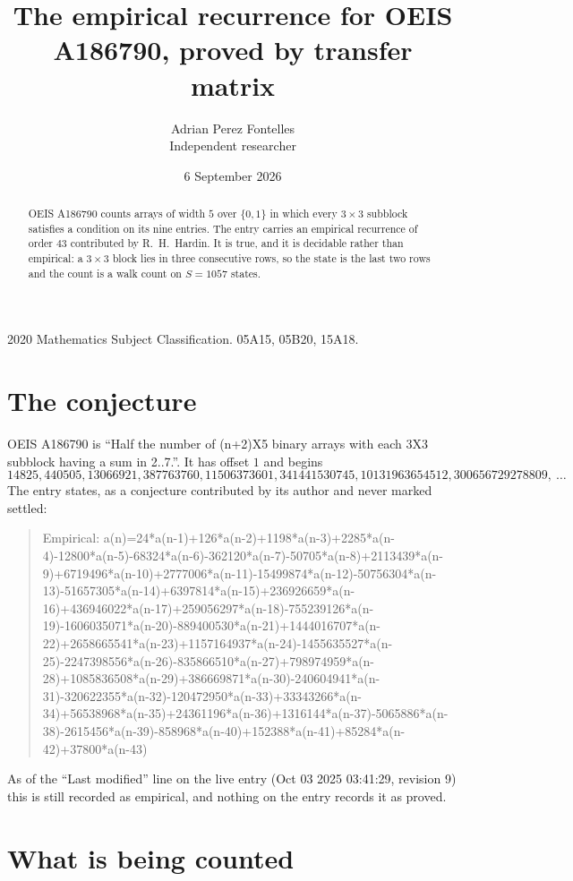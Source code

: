 \documentclass[11pt,a4paper]{article}
\title{The empirical recurrence for OEIS A186790, proved by transfer matrix}
\author{Adrian Perez Fontelles\\ \small Independent researcher}
\date{6 September 2026}
\theoremstyle{plain}
\theoremstyle{definition}
\begin{document}
\maketitle

\begin{abstract}
OEIS A186790 counts arrays of width $5$ over $\{0,1\}$ in which every $3\times3$ subblock
satisfies a condition on its nine entries. The entry carries an empirical recurrence of order
$43$ contributed by R.~H.~Hardin. It is true, and it is decidable rather than empirical: a
$3\times3$ block lies in three consecutive rows, so the state is the last two rows and the
count is a walk count on $S=1057$ states.
\end{abstract}

\noindent\small 2020 Mathematics Subject Classification. 05A15, 05B20, 15A18.\normalsize

\section{The conjecture}

OEIS A186790 is ``Half the number of (n+2)X5 binary arrays with each 3X3 subblock having a sum in 2..7.''. It has offset $1$ and begins
\[
14825, 440505, 13066921, 387763760, 11506373601, 341441530745, 10131963654512, 300656729278809,\ \dots
\]
The entry states, as a conjecture contributed by its author and never marked settled:
\begin{quote}
Empirical: a(n)=24*a(n-1)+126*a(n-2)+1198*a(n-3)+2285*a(n-4)-12800*a(n-5)-68324*a(n-6)-362120*a(n-7)-50705*a(n-8)+2113439*a(n-9)+6719496*a(n-10)+2777006*a(n-11)-15499874*a(n-12)-50756304*a(n-13)-51657305*a(n-14)+6397814*a(n-15)+236926659*a(n-16)+436946022*a(n-17)+259056297*a(n-18)-755239126*a(n-19)-1606035071*a(n-20)-889400530*a(n-21)+1444016707*a(n-22)+2658665541*a(n-23)+1157164937*a(n-24)-1455635527*a(n-25)-2247398556*a(n-26)-835866510*a(n-27)+798974959*a(n-28)+1085836508*a(n-29)+386669871*a(n-30)-240604941*a(n-31)-320622355*a(n-32)-120472950*a(n-33)+33343266*a(n-34)+56538968*a(n-35)+24361196*a(n-36)+1316144*a(n-37)-5065886*a(n-38)-2615456*a(n-39)-858968*a(n-40)+152388*a(n-41)+85284*a(n-42)+37800*a(n-43)
\end{quote}
As of the ``Last modified'' line on the live entry (Oct 03 2025 03:41:29, revision 9) this is still
recorded as empirical, and nothing on the entry records it as proved.

\section{What is being counted}
\end{document}
